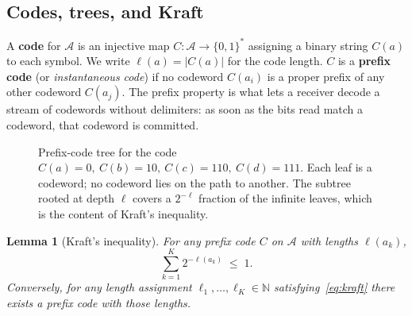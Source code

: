 \documentclass[12pt,a4paper]{article}
\theoremstyle{plain}
\newtheorem{lemma}[theorem]{Lemma}
\theoremstyle{definition}
\begin{document}
\subsection*{Codes, trees, and Kraft}

A \textbf{code} for $\mathcal{A}$ is an injective map
$C : \mathcal{A} \to \{0,1\}^*$ assigning a binary string $C(a)$ to
each symbol. We write $\ell(a) = |C(a)|$ for the code length. $C$
is a \textbf{prefix code} (or \emph{instantaneous code}) if no
codeword $C(a_i)$ is a proper prefix of any other codeword $C(a_j)$.
The prefix property is what lets a receiver decode a stream of
codewords without delimiters: as soon as the bits read match a
codeword, that codeword is committed.

\begin{figure}[h]
\centering
{}
\caption{Prefix-code tree for the code $C(a)=0,\ C(b)=10,\
C(c)=110,\ C(d)=111$. Each leaf is a codeword; no codeword lies on
the path to another. The subtree rooted at depth $\ell$ covers a
$2^{-\ell}$ fraction of the infinite leaves, which is the content of
Kraft's inequality.}
\label{fig:prefix-tree}
\end{figure}

\begin{lemma}[Kraft's inequality]
\label{lem:kraft}
For any prefix code $C$ on $\mathcal{A}$ with lengths $\ell(a_k)$,
\begin{equation}
  \sum_{k=1}^{K} 2^{-\ell(a_k)} \;\le\; 1.
  \label{eq:kraft}
\end{equation}
Conversely, for any length assignment $\ell_1, \dots, \ell_K \in
\mathbb{N}$ satisfying~\eqref{eq:kraft} there exists a prefix code
with those lengths.
\end{lemma}
\end{document}
